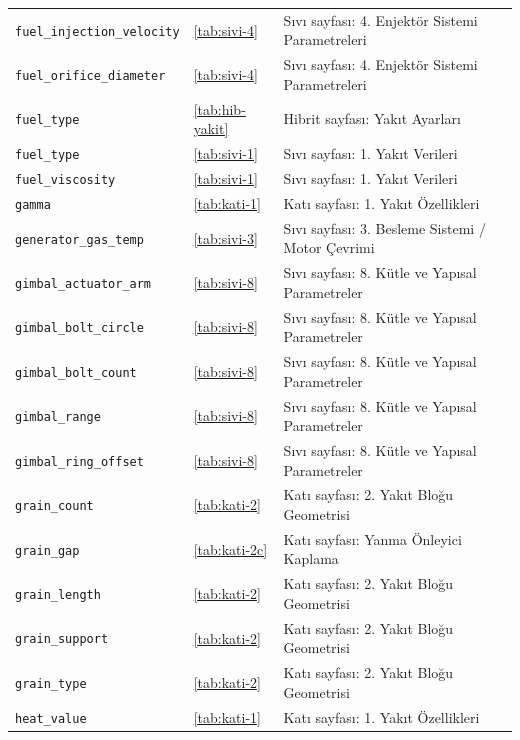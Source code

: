 \documentclass[11pt,a4paper]{article}
\begin{document}
{\begin{longtable}{@{}>{\raggedright\arraybackslash}p{5.2cm}p{1.4cm}>{\raggedright\arraybackslash}p{7.4cm}@{}}
\texttt{fuel\_\allowbreak{}injection\_\allowbreak{}velocity} & \ref{tab:sivi-4} & Sıvı sayfası: 4. Enjektör Sistemi Parametreleri \\
\texttt{fuel\_\allowbreak{}orifice\_\allowbreak{}diameter} & \ref{tab:sivi-4} & Sıvı sayfası: 4. Enjektör Sistemi Parametreleri \\
\texttt{fuel\_\allowbreak{}type} & \ref{tab:hib-yakit} & Hibrit sayfası: Yakıt Ayarları \\
\texttt{fuel\_\allowbreak{}type} & \ref{tab:sivi-1} & Sıvı sayfası: 1. Yakıt Verileri \\
\texttt{fuel\_\allowbreak{}viscosity} & \ref{tab:sivi-1} & Sıvı sayfası: 1. Yakıt Verileri \\
\texttt{gamma} & \ref{tab:kati-1} & Katı sayfası: 1. Yakıt Özellikleri \\
\texttt{generator\_\allowbreak{}gas\_\allowbreak{}temp} & \ref{tab:sivi-3} & Sıvı sayfası: 3. Besleme Sistemi / Motor Çevrimi \\
\texttt{gimbal\_\allowbreak{}actuator\_\allowbreak{}arm} & \ref{tab:sivi-8} & Sıvı sayfası: 8. Kütle ve Yapısal Parametreler \\
\texttt{gimbal\_\allowbreak{}bolt\_\allowbreak{}circle} & \ref{tab:sivi-8} & Sıvı sayfası: 8. Kütle ve Yapısal Parametreler \\
\texttt{gimbal\_\allowbreak{}bolt\_\allowbreak{}count} & \ref{tab:sivi-8} & Sıvı sayfası: 8. Kütle ve Yapısal Parametreler \\
\texttt{gimbal\_\allowbreak{}range} & \ref{tab:sivi-8} & Sıvı sayfası: 8. Kütle ve Yapısal Parametreler \\
\texttt{gimbal\_\allowbreak{}ring\_\allowbreak{}offset} & \ref{tab:sivi-8} & Sıvı sayfası: 8. Kütle ve Yapısal Parametreler \\
\texttt{grain\_\allowbreak{}count} & \ref{tab:kati-2} & Katı sayfası: 2. Yakıt Bloğu Geometrisi \\
\texttt{grain\_\allowbreak{}gap} & \ref{tab:kati-2c} & Katı sayfası: Yanma Önleyici Kaplama \\
\texttt{grain\_\allowbreak{}length} & \ref{tab:kati-2} & Katı sayfası: 2. Yakıt Bloğu Geometrisi \\
\texttt{grain\_\allowbreak{}support} & \ref{tab:kati-2} & Katı sayfası: 2. Yakıt Bloğu Geometrisi \\
\texttt{grain\_\allowbreak{}type} & \ref{tab:kati-2} & Katı sayfası: 2. Yakıt Bloğu Geometrisi \\
\texttt{heat\_\allowbreak{}value} & \ref{tab:kati-1} & Katı sayfası: 1. Yakıt Özellikleri \\

\end{longtable}}
\end{document}
